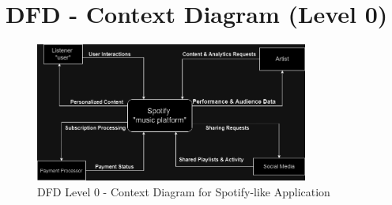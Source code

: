 \documentclass[a4paper,10pt]{article}
\begin{document}
\section{DFD - Context Diagram (Level 0)}
\begin{figure}[h!]
    \centering
    \includegraphics[width=0.8\textwidth]{DFD@Dark.drawio.png}
    \caption{DFD Level 0 - Context Diagram for Spotify-like Application}
    \label{fig:dfd-level0}
\end{figure}
\end{document}
